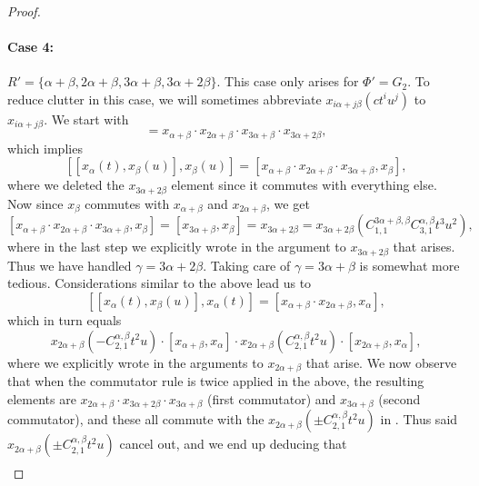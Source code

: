 \documentclass[10pt,a4paper]{article}
\theoremstyle{definition}
\begin{document}
\begin{proof}
    \paragraph{Case 4:} $R' = \{\alpha+\beta, 2\alpha+\beta,3\alpha+\beta, 3\alpha+2\beta\}$. This case only arises for $\Phi' = G_2$.   To reduce clutter in this case, we will sometimes abbreviate $x_{i\alpha+j\beta}(c t^i u^j)$ to $x_{i\alpha+j\beta}$.
    We start with
    \begin{equation}
        [x_\alpha(t),x_\beta(u)] = x_{\alpha+\beta} \cdot x_{2\alpha+\beta} \cdot x_{3\alpha+\beta} \cdot x_{3\alpha+2\beta},  \label{eqn:ugh0} 
    \end{equation}
    which  implies
    \[
        [[x_\alpha(t), x_\beta(u)], x_\beta(u)] = 
        [ x_{\alpha+\beta}\cdot x_{2\alpha+\beta}\cdot x_{3\alpha+\beta}, x_\beta ], 
    \]
    where we deleted the $x_{3\alpha+2\beta}$ element since it commutes with everything else.  Now since $x_\beta$ commutes with $x_{\alpha+\beta}$ and $x_{2\alpha+\beta}$, we get 
    \[
        [ x_{\alpha+\beta}\cdot x_{2\alpha+\beta}\cdot x_{3\alpha+\beta}, x_\beta ] = [x_{3\alpha+\beta},x_\beta] = x_{3\alpha+2\beta} = x_{3\alpha+2\beta}(C_{1,1}^{3\alpha+\beta,\beta} C_{3,1}^{\alpha,\beta} t^3 u^2),
    \]
    where in the last step we explicitly wrote in the argument to $x_{3\alpha+2\beta}$ that arises.  Thus we have  handled $\gamma = 3\alpha + 2\beta$.  Taking care of $\gamma = 3\alpha + \beta$ is somewhat more tedious.  Considerations similar to the above lead us to 
    \[
        [[x_\alpha(t), x_\beta(u)], x_\alpha(t)] = 
        [ x_{\alpha+\beta}\cdot x_{2\alpha+\beta}, x_\alpha ],
    \]
    which in turn equals
    \begin{equation}    \label{eqn:ugh1}
        x_{2\alpha+\beta}(-C_{2,1}^{\alpha,\beta} t^2 u) \cdot [x_{\alpha+\beta},x_\alpha]\cdot x_{2\alpha+\beta}(C_{2,1}^{\alpha,\beta} t^2 u) \cdot [x_{2\alpha+\beta},x_\alpha],
    \end{equation}
    where we explicitly wrote in the arguments to $x_{2\alpha+\beta}$ that arise.  We now observe that when the commutator rule is twice applied in the above, the resulting elements are $x_{2\alpha+\beta} \cdot x_{3\alpha+2\beta} \cdot x_{3\alpha+\beta}$ (first commutator) and $x_{3\alpha+\beta}$ (second commutator), and these all commute with the $x_{2\alpha+\beta}(\pm C_{2,1}^{\alpha,\beta} t^2 u)$ in .  Thus said $x_{2\alpha+\beta}(\pm C_{2,1}^{\alpha,\beta} t^2 u)$ cancel out, and we end up deducing that 
    \begin{multline}    \label{eqn:ugh2}

\end{multline}
\end{proof}
\end{document}
